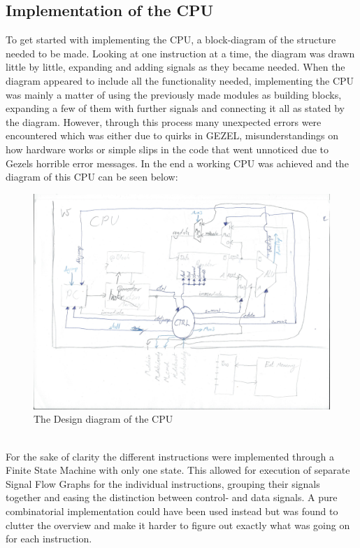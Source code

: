 \documentclass[12pt,a4paper]{article}
\begin{document}
\subsection{Implementation of the CPU}
	To get started with implementing the CPU, a block-diagram of the structure needed to be made. Looking at one instruction at a time, the diagram was drawn little by little, expanding and adding signals as they became needed. When the diagram appeared to include all the functionality needed, implementing the CPU was mainly a matter of using the previously made modules as building blocks, expanding a few of them with further signals and connecting it all as stated by the diagram. However, through this process many unexpected errors were encountered which was either due to quirks in GEZEL, misunderstandings on how hardware works or simple slips in the code that went unnoticed due to Gezels horrible error messages. In the end a working CPU was achieved and the diagram of this CPU can be seen below:\\
	\begin{figure}[h!]
		\centering
			\includegraphics[width=1\textwidth]{Screenshots/Screenshot_DesignDiagram.jpg}
		\caption{The Design diagram of the CPU}
		\label{DesignDiagram}
	\end{figure}
	\\	
	For the sake of clarity the different instructions were implemented through a Finite State Machine with only one state. This allowed for execution of separate Signal Flow Graphs for the individual instructions, grouping their signals together and easing the distinction between control- and data signals. A pure combinatorial implementation could have been used instead but was found to clutter the overview and make it harder to figure out exactly what was going on for each instruction.\\
\end{document}
